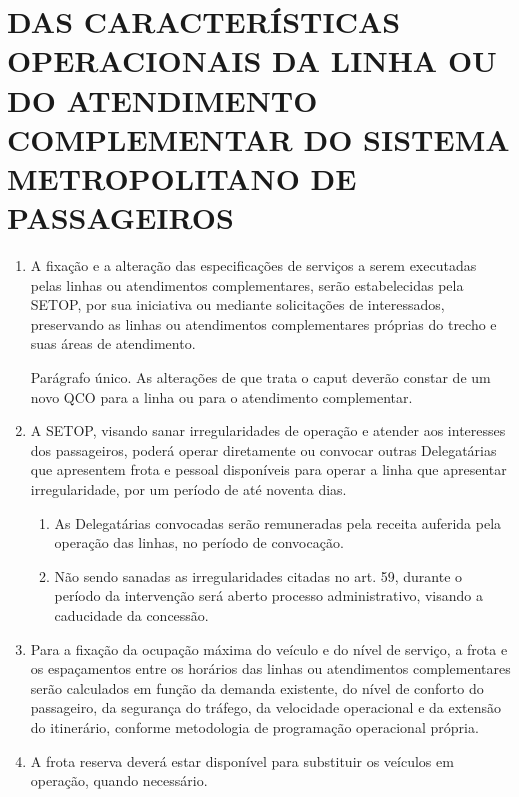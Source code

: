\chapter{DAS CARACTERÍSTICAS OPERACIONAIS DA LINHA OU DO ATENDIMENTO COMPLEMENTAR DO SISTEMA METROPOLITANO DE PASSAGEIROS}

\begin{enumerate}[resume, label=Art. \arabic*]

\item A fixação e a alteração das especificações de serviços a serem executadas pelas linhas ou atendimentos complementares, serão estabelecidas pela SETOP, por sua iniciativa ou mediante solicitações de interessados, preservando as linhas ou atendimentos complementares próprias do trecho e suas áreas de atendimento.

Parágrafo único. As alterações de que trata o caput deverão constar de um novo QCO para a linha ou para o atendimento complementar.

\item A SETOP, visando sanar irregularidades de operação e atender aos interesses dos passageiros, poderá operar diretamente ou convocar outras Delegatárias que apresentem frota e pessoal disponíveis para operar a linha que apresentar irregularidade, por um período de até noventa dias.

\begin{enumerate}[label= \S \arabic*] %

\item As Delegatárias convocadas serão remuneradas pela receita auferida pela operação das linhas, no período de convocação.

\item Não sendo sanadas as irregularidades citadas no art. 59, durante o período da intervenção será aberto processo administrativo, visando a caducidade da concessão.

\end{enumerate}

\item Para a fixação da ocupação máxima do veículo e do nível de serviço, a frota e os espaçamentos entre os horários das linhas ou atendimentos complementares serão calculados em função da demanda existente, do nível de conforto do passageiro, da segurança do tráfego, da velocidade operacional e da extensão do itinerário, conforme metodologia de programação operacional própria.


\item A frota reserva deverá estar disponível para substituir os veículos em operação, quando necessário.


\end{enumerate}

